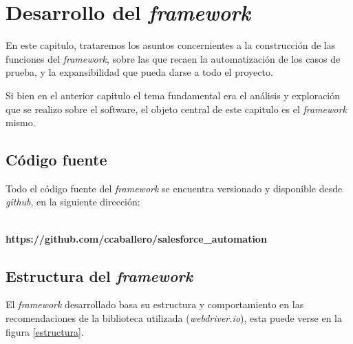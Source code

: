 \chapter{Desarrollo del \emph{framework}}

En este capitulo, trataremos los asuntos concernientes a la construcción de las
funciones del \emph{framework}, sobre las que recaen la automatización de los
casos de prueba, y la expansibilidad que pueda darse a todo el proyecto.

Si bien en el anterior capitulo el tema fundamental era el análisis y
exploración que se realizo sobre el software, el objeto central de este
capitulo es el \emph{framework} mismo.

\section{Código fuente}
Todo el código fuente del \emph{framework} se encuentra versionado y disponible
desde \emph{github}, en la siguiente dirección:
\\
\\
\centerline{\textbf{https://github.com/ccaballero/salesforce\_automation}}

\section{Estructura del \emph{framework}}
El \emph{framework} desarrollado basa su estructura y comportamiento en las
recomendaciones de la biblioteca utilizada (\emph{webdriver.io}), esta puede
verse en la figura \ref{estructura}.

